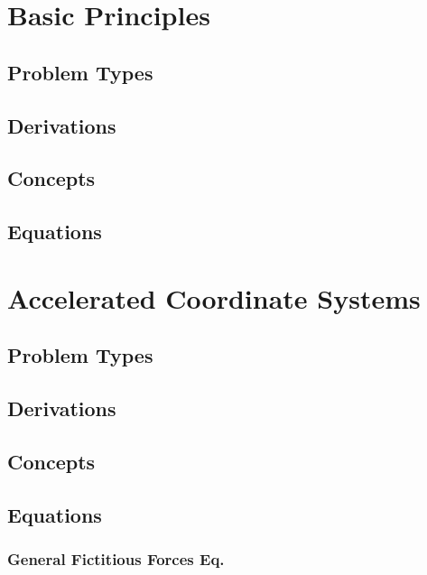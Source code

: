 \documentclass[25pt]{book}
\begin{document}
	
	\tableofcontents
	
	\chapter{Basic Principles}
	
	\section{Problem Types}
	
	\section{Derivations}
	
	\section{Concepts}
	
	\section{Equations}
	
	\chapter{Accelerated Coordinate Systems}
	
	\section{Problem Types}
	
	\section{Derivations}
	
	\section{Concepts}
	
	\section{Equations}
	
	\subsection{General Fictitious Forces Eq.}
	
\end{document}
